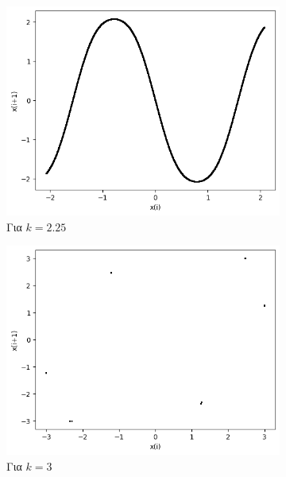 \begin{figure}[ht]
\begin{subfigure}[b]{0.4\textwidth}
		\includegraphics[width=\textwidth]{LateX images/sine q=-0.5/g19}
		\caption{Για $k=2.25$}
		\label{f:k129}
	\end{subfigure}
	\hfill
	\begin{subfigure}[b]{0.4\textwidth}
		\centering
		\includegraphics[width=\textwidth]{LateX images/sine q=-0.5/g18}
		\caption{Για $k=3$}
		\label{f:k130}
	\end{subfigure}
	\hfill
	\begin{subfigure}[b]{0.4\textwidth}
		\centering

\end{subfigure}
\end{figure}
